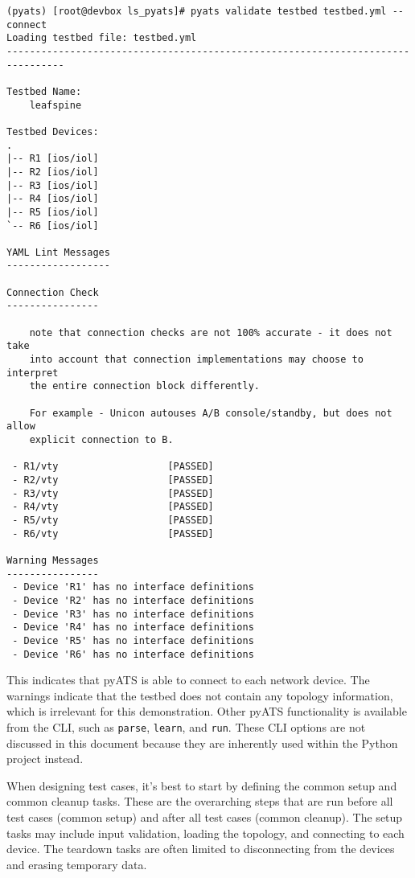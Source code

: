\begin{verbatim}
(pyats) [root@devbox ls_pyats]# pyats validate testbed testbed.yml --connect
Loading testbed file: testbed.yml
--------------------------------------------------------------------------------

Testbed Name:
    leafspine

Testbed Devices:
.
|-- R1 [ios/iol]
|-- R2 [ios/iol]
|-- R3 [ios/iol]
|-- R4 [ios/iol]
|-- R5 [ios/iol]
`-- R6 [ios/iol]

YAML Lint Messages
------------------

Connection Check
----------------

    note that connection checks are not 100% accurate - it does not take
    into account that connection implementations may choose to interpret
    the entire connection block differently.

    For example - Unicon autouses A/B console/standby, but does not allow
    explicit connection to B.

 - R1/vty                   [PASSED]
 - R2/vty                   [PASSED]
 - R3/vty                   [PASSED]
 - R4/vty                   [PASSED]
 - R5/vty                   [PASSED]
 - R6/vty                   [PASSED]

Warning Messages
----------------
 - Device 'R1' has no interface definitions
 - Device 'R2' has no interface definitions
 - Device 'R3' has no interface definitions
 - Device 'R4' has no interface definitions
 - Device 'R5' has no interface definitions
 - Device 'R6' has no interface definitions
\end{verbatim}

This indicates that pyATS is able to connect to each network device. The
warnings indicate that the testbed does not contain any topology information,
which is irrelevant for this demonstration. Other pyATS functionality is
available from the CLI, such as \verb|parse|, \verb|learn|, and \verb|run|.
These CLI options are not discussed in this document because they are
inherently used within the Python project instead.

When designing test cases, it's best to start by defining the common setup
and common cleanup tasks. These are the overarching steps that are run before
all test cases (common setup) and after all test cases (common cleanup). The
setup tasks may include input validation, loading the topology, and connecting
to each device. The teardown tasks are often limited to disconnecting from the
devices and erasing temporary data.

